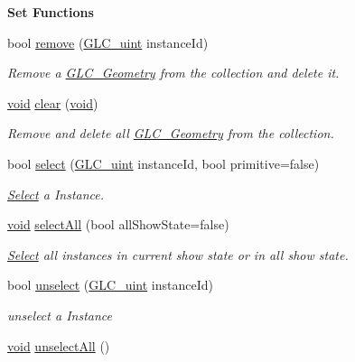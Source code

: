 \begin{Indent}{\bf Set Functions}
\begin{DoxyCompactItemize}
bool \hyperlink{class_g_l_c__3_d_view_collection_a0d599f103d2072bf2e5ee9810a22242a}{remove} (\hyperlink{glc__global_8h_abf950976fabed69026558df8e2da6c6b}{G\-L\-C\-\_\-uint} instance\-Id)
\begin{DoxyCompactList}\small\item\em Remove a \hyperlink{class_g_l_c___geometry}{G\-L\-C\-\_\-\-Geometry} from the collection and delete it. \end{DoxyCompactList}\item 
\hyperlink{group___u_a_v_objects_plugin_ga444cf2ff3f0ecbe028adce838d373f5c}{void} \hyperlink{class_g_l_c__3_d_view_collection_a44078ff3fce1e1fd54d520dd2681aa09}{clear} (\hyperlink{group___u_a_v_objects_plugin_ga444cf2ff3f0ecbe028adce838d373f5c}{void})
\begin{DoxyCompactList}\small\item\em Remove and delete all \hyperlink{class_g_l_c___geometry}{G\-L\-C\-\_\-\-Geometry} from the collection. \end{DoxyCompactList}\item 
bool \hyperlink{class_g_l_c__3_d_view_collection_a6517ced4b82bb3c851e35a2bf0637cd0}{select} (\hyperlink{glc__global_8h_abf950976fabed69026558df8e2da6c6b}{G\-L\-C\-\_\-uint} instance\-Id, bool primitive=false)
\begin{DoxyCompactList}\small\item\em \hyperlink{class_select}{Select} a Instance. \end{DoxyCompactList}\item 
\hyperlink{group___u_a_v_objects_plugin_ga444cf2ff3f0ecbe028adce838d373f5c}{void} \hyperlink{class_g_l_c__3_d_view_collection_ab421aa5e688b358a9770c68d83579322}{select\-All} (bool all\-Show\-State=false)
\begin{DoxyCompactList}\small\item\em \hyperlink{class_select}{Select} all instances in current show state or in all show state. \end{DoxyCompactList}\item 
bool \hyperlink{class_g_l_c__3_d_view_collection_a38afb06c2d281c3acf077b87d5424a10}{unselect} (\hyperlink{glc__global_8h_abf950976fabed69026558df8e2da6c6b}{G\-L\-C\-\_\-uint} instance\-Id)
\begin{DoxyCompactList}\small\item\em unselect a Instance \end{DoxyCompactList}\item 
\hyperlink{group___u_a_v_objects_plugin_ga444cf2ff3f0ecbe028adce838d373f5c}{void} \hyperlink{class_g_l_c__3_d_view_collection_adb2ba70a67c8c3f4dccc8ecd392040f4}{unselect\-All} ()

\end{DoxyCompactItemize}
\end{Indent}
